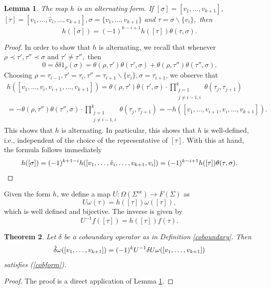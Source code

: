 \documentclass[10pt]{amsart}
\newtheorem{theorem}{Theorem}[section]
\newtheorem{lemma}[theorem]{Lemma}
\theoremstyle{definition}
\newcommand{\F}{{F}}
\begin{document}
\begin{lemma}\label{h}
   The map $h$ is an alternating form. If $[\sigma] = [v_1,\ldots,v_{k+1}]$, $[\tau] = [v_1,\ldots,\hat{v}_i,\ldots,v_{k+1}],\sigma = \lbrace v_1,\ldots,v_{k+1}\rbrace$ and $\tau = \sigma\backslash\lbrace v_i\rbrace,$ then $$h([\sigma]) = (-1)^{k-i+1}h([\tau])\theta(\tau,\sigma).$$
\end{lemma}
\begin{proof}
    In order to show that $h$ is alternating, %
     we recall that whenever $\rho\prec\tau',\tau''\prec\sigma$ and $\tau'\neq\tau'',$ then 
    $$0 = \delta\delta 1_\rho(\sigma) = \theta(\rho,\tau')\theta(\tau',\sigma)+\theta(\rho,\tau'')\theta(\tau'',\sigma).$$ Choosing $\rho = \tau_{i-1},\tau' = \tau_i,\tau'' = \tau_{i+1}\backslash\lbrace v_{i}\rbrace,\sigma = \tau_{i+1}$, we observe that
    \begin{multline*}
        h([v_1,\ldots,v_i,v_{i+1},\ldots,v_{k+1}])  = \theta(\rho,\tau')\theta(\tau',\sigma)\cdot\prod_{\substack{j = 1\\j\neq i-1,i}}^{k}\theta(\tau_j,\tau_{j+1})\\
        = -\theta(\rho,\tau'')\theta(\tau'',\sigma)\cdot\prod_{\substack{j = 1\\j\neq i-1,i}}^{k}\theta(\tau_j,\tau_{j+1})
        = -h([v_1,\ldots,v_{i+1},v_i,\ldots,v_{k+1}]).
    \end{multline*}
    This shows that $h$ is alternating. In particular, this shows that $h$ is well-defined, i.e., independent of the choice of the representative of $[\tau]$.     
    With this at hand, the formula follows immediately
    \begin{equation*}
    	h([\sigma]) = (-1)^{k+1-i}h([v_1,\ldots,\hat{v}_i,\ldots,v_{k+1},v_i]) = (-1)^{k-i+1}h([\tau])\theta(\tau,\sigma).\hfill\qedhere
    \end{equation*}
\end{proof}
Given the form $h$, we define a map $U:\Omega(\Sigma^{\mathrm{or}})\rightarrow \F(\Sigma)$ as $$U\omega(\tau) = h([\tau])\omega([\tau]),$$ which is well defined and bijective.  The inverse is given by $$U^{-1}f([\tau]) = h([\tau])f(\tau).$$
\begin{theorem}
    Let $\delta$ be a coboundary operator as in Definition \ref{coboundary}. Then 
    $$\Tilde{\delta}\omega([v_1,\ldots,v_{k+1}]) = (-1)^k U^{-1}\delta U\omega([v_1,\ldots,v_{k+1}])$$  satisfies (\ref{cobform}).
\end{theorem}
\begin{proof}
    The proof is a direct application of Lemma \ref{h}.
\end{proof}
\end{document}
